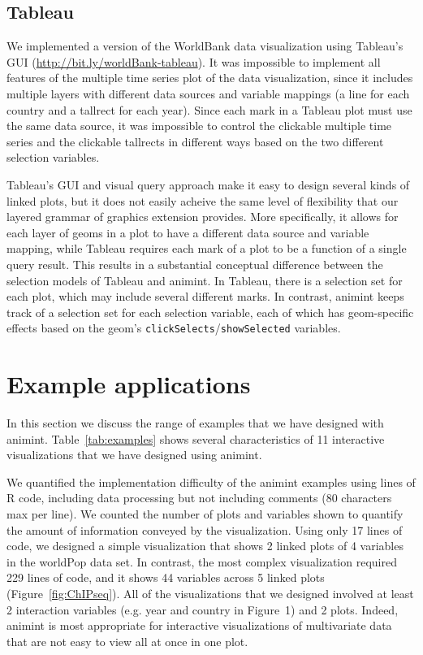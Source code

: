 \documentclass[journal]{vgtc}\usepackage[]{graphicx}\usepackage[]{color}
\begin{document}
\subsection{Tableau}

We implemented a version of the WorldBank data visualization using
Tableau's GUI (\url{http://bit.ly/worldBank-tableau}).
It was impossible to implement all features of the multiple time
series plot of the data visualization, since it includes multiple
layers with different data sources and variable mappings (a line for
each country and a tallrect for each year). Since each mark in a
Tableau plot must use the same data source, it was impossible to
control the clickable multiple time series and the clickable tallrects
in different ways based on the two different selection variables.

Tableau's GUI and visual query approach
make it easy to design several kinds of linked plots, but it does not
easily acheive the same level of flexibility that our
layered grammar of graphics extension provides. More specifically, it allows
for each layer of geoms in a plot to have a different data source and
variable mapping, while Tableau requires each mark of a plot to be a
function of a single query result. This results in a substantial
conceptual difference between the selection models of Tableau and animint. In Tableau, there is a selection set for each plot, which may
include several different marks. In contrast, animint keeps track of a
selection set for each selection variable, each of which has
geom-specific effects based on the geom's \texttt{clickSelects}/\texttt{showSelected}
variables.


\section{Example applications}

In this section we discuss the range of examples that we have designed
with animint. Table~\ref{tab:examples} shows several characteristics
of 11 interactive visualizations that we have designed using
animint.

We quantified the implementation difficulty of the animint examples
using lines of R code, including data processing but not including
comments (80 characters max per line). We counted the number of plots
and variables shown to quantify the amount of information conveyed by
the visualization. Using only 17 lines of code, we designed a simple
visualization that shows 2 linked plots of 4 variables in the worldPop
data set. In contrast, the most complex visualization required 229
lines of code, and it shows 44 variables across 5 linked plots
(Figure~\ref{fig:ChIPseq}). All of the visualizations that we designed
involved at least 2 interaction variables (e.g. year and country in
Figure~1) and 2 plots. Indeed, animint is most appropriate for
interactive visualizations of multivariate data that are not easy to
view all at once in one plot.
\end{document}
